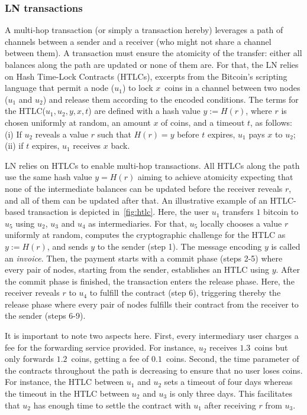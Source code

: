 \subsubsection*{LN transactions} A multi-hop transaction (or simply a transaction hereby) leverages a 
path of channels between a sender and a receiver (who might not share a channel between them).
A transaction must ensure the atomicity of the transfer: 
either all balances along the path are updated or none of them are.
For that, the LN relies on Hash Time-Lock Contracts (HTLCs), 
 excerpts from the  Bitcoin's scripting language that 
permit a node ($u_1$) to lock $x$~coins in a channel between two nodes ($u_1$ and $u_2$) 
and release them according to the encoded conditions.
The terms for the HTLC($u_1, u_2, y, x, t$) are defined with a hash value $y := H(r)$, 
where $r$ is chosen uniformly at random, 
an amount $x$ of coins, and a timeout $t$, as follows: 
(i) If $u_2$ reveals a value $r$ such that $H(r) = y$ before $t$ expires, $u_1$ pays $x$  to $u_2$; 
(ii) if $t$ expires, $u_1$ receives $x$  back.

LN relies on HTLCs to enable multi-hop transactions.  
All HTLCs along the path use the same hash value $y=H(r)$ aiming to achieve atomicity expecting that 
none of the intermediate balances can be updated before the receiver reveals $r$, and all of them can be updated after that.
An illustrative example of an HTLC-based transaction is depicted in~\cref{fig:htlc}.
Here, the user $u_1$ transfers $1$ bitcoin to $u_5$ using $u_2$, $u_3$ and $u_4$ as intermediaries. 
For that, $u_5$ locally chooses a value $r$ 
uniformly at random, computes the cryptographic challenge for the HTLC as $y := H(r)$, 
and sends $y$ to the sender (step 1).
The message encoding $y$ is called an \textit{invoice}.
Then, the payment starts with a commit phase (steps 2-5) where every pair of nodes, 
starting from the sender, establishes an HTLC using $y$.
After the commit phase is finished, the transaction enters the release phase.
Here, the receiver reveals $r$ to $u_4$ to fulfill the contract (step 6), 
triggering thereby the release phase where every pair of nodes fulfills their 
contract from the receiver to the sender (steps 6-9).

It is important to note two aspects here.
First, every intermediary user charges a fee for the forwarding service provided. 
For instance, $u_2$ receives $1.3$~coins but only forwards $1.2$~coins, getting a fee of $0.1$~coins. 
Second, the time parameter of the contracts throughout the path is decreasing to ensure that no user loses coins. 
For instance, the HTLC between $u_1$ and $u_2$ sets a timeout of four days 
whereas the timeout in the HTLC between $u_2$ and $u_3$ is only three days.
This facilitates that 
$u_2$ has enough time to settle the contract with $u_1$ after receiving $r$ from $u_3$.

